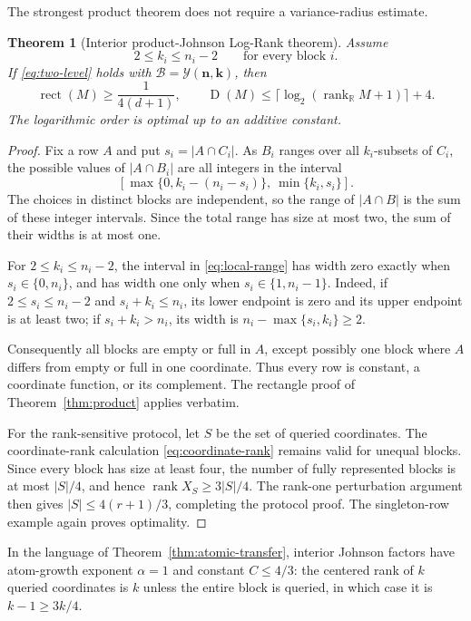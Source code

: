 \documentclass[11pt]{article}
\newtheorem{theorem}{Theorem}[section]
\theoremstyle{definition}
\theoremstyle{remark}
\newcommand{\cB}{\mathcal B}
\newcommand{\cY}{\mathcal Y}
\newcommand{\R}{\mathbb R}
\newcommand{\1}{\mathbf 1}
\newcommand{\rank}{\operatorname{rank}}
\newcommand{\rect}{\operatorname{rect}}
\newcommand{\Dcc}{\operatorname{D}}
\begin{document}
The strongest product theorem does not require a variance-radius estimate.

\begin{theorem}[Interior product-Johnson Log-Rank theorem]
\label{thm:interior-product}
Assume
\[
 2\le k_i\le n_i-2
 \qquad\text{for every block }i.
\]
If \eqref{eq:two-level} holds with
$\cB=\cY(\mathbf n,\mathbf k)$, then
\[
 \rect(M)\ge\frac1{4(d+1)},
 \qquad
 \Dcc(M)\le\lceil\log_2(\rank_{\R}M+1)\rceil+4.
\]
The logarithmic order is optimal up to an additive constant.
\end{theorem}

\begin{proof}
Fix a row $A$ and put $s_i=|A\cap C_i|$.  As $B_i$ ranges over all
$k_i$-subsets of $C_i$, the possible values of $|A\cap B_i|$ are all integers
in the interval
\begin{equation}\label{eq:local-range}
 \left[
  \max\{0,k_i-(n_i-s_i)\},\ \min\{k_i,s_i\}
 \right].
\end{equation}
The choices in distinct blocks are independent, so the range of
$|A\cap B|$ is the sum of these integer intervals.  Since the total range has
size at most two, the sum of their widths is at most one.

For $2\le k_i\le n_i-2$, the interval in \eqref{eq:local-range} has width zero exactly when
$s_i\in\{0,n_i\}$, and has width one only when
$s_i\in\{1,n_i-1\}$.  Indeed, if $2\le s_i\le n_i-2$ and
$s_i+k_i\le n_i$, its lower endpoint is zero and its upper endpoint is at
least two; if $s_i+k_i>n_i$, its width is
$n_i-\max\{s_i,k_i\}\ge2$.

Consequently all blocks are empty or full in $A$, except possibly one block
where $A$ differs from empty or full in one coordinate.  Thus every row is
constant, a coordinate function, or its complement.  The rectangle proof of
Theorem~\ref{thm:product} applies verbatim.

For the rank-sensitive protocol, let $S$ be the set of queried coordinates.
The coordinate-rank calculation \eqref{eq:coordinate-rank} remains valid for
unequal blocks.  Since every block has size at least four, the number of fully
represented blocks is at most $|S|/4$, and hence
$\rank X_S\ge3|S|/4$.  The rank-one perturbation argument then gives
$|S|\le4(r+1)/3$, completing the protocol proof.  The singleton-row example
again proves optimality.
\end{proof}

In the language of Theorem~\ref{thm:atomic-transfer}, interior Johnson factors
have atom-growth exponent $\alpha=1$ and constant $C\le4/3$: the centered
rank of $k$ queried coordinates is $k$ unless the entire block is queried,
in which case it is $k-1\ge3k/4$.
\end{document}
